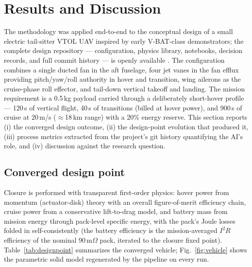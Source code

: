 \section{Results and Discussion}
\label{sec:results}

The methodology was applied end-to-end to the conceptual design of a
small electric tail-sitter VTOL UAV inspired by early V-BAT-class
demonstrators; the complete design repository --- configuration,
physics library, notebooks, decision records, and full commit history
--- is openly available \citep{tuncer2026vbat}. The configuration
combines a single ducted fan in the aft fuselage, four jet vanes in
the fan efflux providing pitch/yaw/roll authority in hover and
transition, wing ailerons as the cruise-phase roll effector, and
tail-down vertical takeoff and landing. The mission requirement is a
0.5\,kg payload carried through a deliberately short-hover profile ---
120\,s of vertical flight, 40\,s of transitions (billed at hover
power), and 900\,s of cruise at 20\,m/s ($\approx$18\,km range) with a
20\% energy reserve. This section reports (i) the converged design
outcome, (ii) the design-point evolution that produced it, (iii)
process metrics extracted from the project's git history quantifying
the AI's role, and (iv) discussion against the research question.

\subsection{Converged design point}
\label{sec:design-results}

Closure is performed with transparent first-order physics: hover power
from momentum (actuator-disk) theory with an overall figure-of-merit
efficiency chain, cruise power from a conservative lift-to-drag model,
and battery mass from mission energy through pack-level specific
energy, with the pack's Joule losses folded in self-consistently (the
battery efficiency is the mission-averaged $I^2R$ efficiency of the
nominal 90\,m$\Omega$ pack, iterated to the closure fixed point).
Table~\ref{tab:designpoint} summarizes the converged vehicle;
Fig.~\ref{fig:vehicle} shows the parametric solid model regenerated by
the pipeline on every run.

